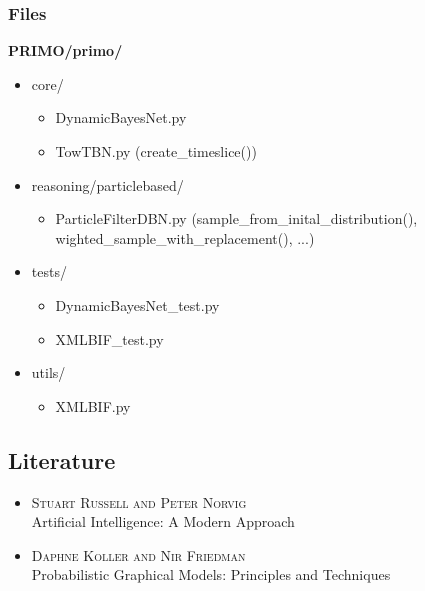 \begin{frame}
\frametitle{Files}
\Large\textbf{PRIMO/primo/}
\begin{itemize}
	\item core/
	\begin{itemize}
		\item DynamicBayesNet.py
		\item TowTBN.py (create\_timeslice())
	\end{itemize}
	\item reasoning/particlebased/
	\begin{itemize}
		\item ParticleFilterDBN.py (sample\_from\_inital\_distribution(), wighted\_sample\_with\_replacement(), ...)
	\end{itemize}
	\item tests/
	\begin{itemize}
		\item DynamicBayesNet\_test.py
		\item XMLBIF\_test.py
	\end{itemize}
	\item utils/
	\begin{itemize}
		\item XMLBIF.py
	\end{itemize}
\end{itemize}
\end{frame}

\subsection{Literature}
\begin{frame}
\begin{itemize}
\item \textsc{Stuart Russell and Peter Norvig} \\ Artificial Intelligence: A Modern Approach
\item \textsc{Daphne Koller and Nir Friedman} \\ Probabilistic Graphical Models: Principles and Techniques
\end{itemize}
\end{frame}
